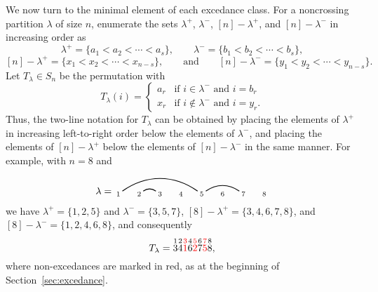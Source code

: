 \documentclass[12pt]{amsart}
\theoremstyle{definition}
\theoremstyle{remark}
\numberwithin{equation}{section}
\renewcommand{\setminus}{-}
\begin{document}

We now turn to the minimal element of each excedance class.  For a noncrossing partition $\lambda$ of size $n$, enumerate the sets $\lambda^{+}$, $\lambda^{-}$, $[n] \setminus \lambda^{+}$, and  $[n] \setminus \lambda^{-}$ in increasing order as
\[
\lambda^{+} = \{a_{1} < a_{2} < \cdots < a_{s}\},
\qquad
\lambda^{-} = \{b_{1} < b_{2} < \cdots < b_{s}\},
\]
\[
[n] \setminus \lambda^{+} = \{x_{1} < x_{2} < \cdots < x_{n-s}\},
\qquad\text{and}\qquad
[n] \setminus \lambda^{-} = \{y_{1} < y_{2} < \cdots < y_{n-s}\}.
\]
Let $T_{\lambda} \in S_{n}$ be the permutation with
\[
T_{\lambda}(i) = \begin{cases} a_{r} & \text{if $i \in \lambda^{-}$ and $i = b_{r}$} \\ x_{r} & \text{if $i \notin \lambda^{-}$ and $i = y_{r}$.}  \end{cases}
\]
Thus, the two-line notation for $T_{\lambda}$ can be obtained by placing the elements of $\lambda^{+}$ in increasing left-to-right order below the elements of $\lambda^{-}$, and placing the elements of $[n] \setminus \lambda^{+}$ below the elements of $[n] \setminus \lambda^{-}$ in the same manner.  For example, with $n = 8$ and 
\[
\lambda = \begin{tikzpicture}[scale = 0.75, baseline = 0.75*-0.2]
\foreach \x in {1, ..., 8}{\draw[fill] (\x - 1, 0) node[inner sep = 2pt] (\x) {$\scriptstyle \x$};}
\foreach \i\j in {1/5, 2/3, 5/7}{\draw[thick] (\i) to[out = 35, in = 145] (\j);}
\end{tikzpicture}
\]
we have $\lambda^{+} = \{1, 2, 5\}$ and $\lambda^{-} = \{3, 5, 7\}$, $[8] \setminus \lambda^{+} = \{3, 4, 6, 7, 8\}$, and $[8] \setminus \lambda^{-} = \{1, 2, 4, 6, 8\}$, and consequently
\[
T_{\lambda} = \overset{1}{3} \overset{2}{4} {\color{red} \overset{3}{1}} \overset{4}{6} {\color{red} \overset{5}{2}} \overset{6}{7} {\color{red} \overset{7}{5}} \overset{8}{8},
\]
where non-excedances are marked in red, as at the beginning of Section~\ref{sec:excedance}.
\end{document}
